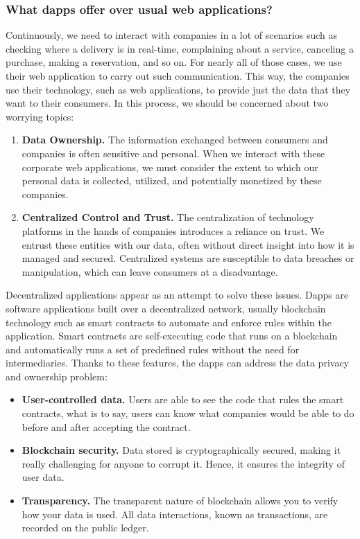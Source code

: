 \subsubsection{What dapps offer over usual web applications?}
Continuously, we need to interact with companies in a lot of scenarios such as checking where a delivery is in real-time, complaining about a service, canceling a purchase, making a reservation, and so on. For nearly all of those cases, we use their web application to carry out such communication. This way, the companies use their technology, such as web applications, to provide just the data that they want to their consumers. In this process, we should be concerned about two worrying topics:
\begin{enumerate}
    \item \textbf{Data Ownership.} The information exchanged between consumers and companies is often sensitive and personal. When we interact with these corporate web applications, we must consider the extent to which our personal data is collected, utilized, and potentially monetized by these companies. 
    \item \textbf{Centralized Control and Trust.} The centralization of technology platforms in the hands of companies introduces a reliance on trust. We entrust these entities with our data, often without direct insight into how it is managed and secured. Centralized systems are susceptible to data breaches or manipulation, which can leave consumers at a disadvantage.
\end{enumerate}

{Decentralized applications appear as an attempt to solve these issues. Dapps are software applications built over a decentralized network, usually blockchain technology such as smart contracts to automate and enforce rules within the application. Smart contracts are self-executing code that runs on a blockchain and automatically runs a set of predefined rules without the need for intermediaries. Thanks to these features, the dapps can address the data privacy and ownership problem:}

\begin{itemize}
    \item \textbf{User-controlled data.} Users are able to see the code that rules the smart contracts, what is to say, users can know what companies would be able to do before and after accepting the contract.
    \item \textbf{Blockchain security.} Data stored is cryptographically secured, making it really challenging for anyone to corrupt it. Hence, it ensures the integrity of user data.
    \item \textbf{Transparency.} The transparent nature of blockchain allows you to verify how your data is used. All data interactions, known as transactions, are recorded on the public ledger.
\end{itemize}

